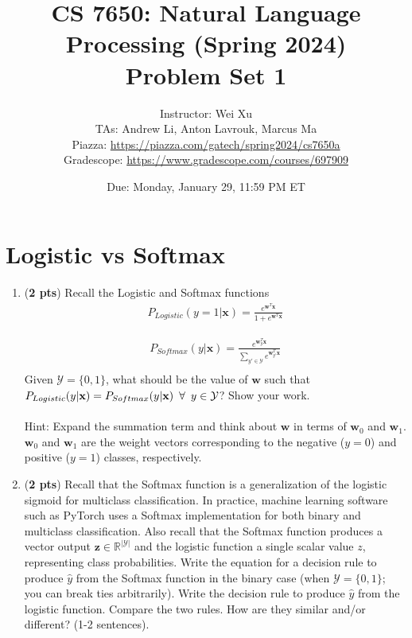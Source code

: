 \documentclass[11pt, letterpaper]{article}
\begin{document}
\title{CS 7650: Natural Language Processing (Spring 2024) \\ Problem Set 1}
\author{Instructor: Wei Xu \\ TAs: Andrew Li, Anton Lavrouk, Marcus Ma
\\Piazza: 
\url{https://piazza.com/gatech/spring2024/cs7650a}
\\Gradescope: \url{https://www.gradescope.com/courses/697909}}
\date{Due: Monday, January 29, 11:59 PM ET}
\maketitle

    \section{Logistic vs Softmax}

    \begin{enumerate}
        \item (\textbf{2 pts}) Recall the Logistic and Softmax functions
    \begin{align*}
        P_{Logistic}(y=1|\mathbf{x}) = \frac{e^{\mathbf{w}^T\mathbf{x}}}{1 + e^{\mathbf{w}^T\mathbf{x}}}
    \end{align*}
    
    \begin{align*}
        P_{Softmax}(y|\mathbf{x}) = \frac{e^{\mathbf{w}_y^T\mathbf{x}}}{\sum_{y' \in \mathcal{Y}} e^{\mathbf{w}_{y'}^T\mathbf{x}}} \\
    \end{align*}
    Given $\mathcal{Y} = \{0,1\}$, what should be the value of $\mathbf{w}$ such that $P_{Logistic}(y|\textbf{x}) = P_{Softmax}(y|\textbf{x}) \hspace{0.5em} \forall \hspace{0.5em} y \in \mathcal{Y}$? Show your work. \\ \\
    Hint: Expand the summation term and think about $\mathbf{w}$ in terms of $\mathbf{w}_0$ and $\mathbf{w}_1$. $\mathbf{w}_0$ and $\mathbf{w}_1$ are the weight vectors corresponding to the negative ($y=0$) and positive ($y=1$) classes, respectively. 
    
    \item (\textbf{2 pts}) Recall that the Softmax function is a generalization of the logistic sigmoid for multiclass classification. In practice, machine learning software such as PyTorch uses a Softmax implementation for both binary and multiclass classification. Also recall that the Softmax function produces a vector output $\mathbf{z} \in \mathbb{R}^{|\mathcal{Y}|}$ and the logistic function a single scalar value $z$, representing class probabilities. Write the equation for a decision rule to produce $\hat{y}$ from the Softmax function in the binary case (when $\mathcal{Y} = \{0,1\}$; you can break ties arbitrarily).
    Write the decision rule to produce $\hat{y}$ from the logistic function. Compare the two rules. How are they similar and/or different? (1-2 sentences).
    \end{enumerate}
\end{document}
